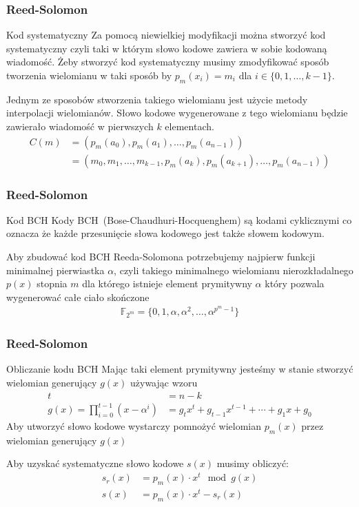 \documentclass{beamer}
\begin{document}
\begin{frame}
	\frametitle{Reed-Solomon}
	\begin{exampleblock}{Kod systematyczny}
		Za pomocą niewielkiej modyfikacji można stworzyć kod systematyczny czyli taki w którym słowo kodowe zawiera w sobie kodowaną wiadomość.
		Żeby stworzyć kod systematyczny musimy zmodyfikować sposób tworzenia wielomianu w taki sposób by $p_m(x_i)=m_i$ dla $i \in \{0,1,\ldots,k-1\}$.

		Jednym ze sposobów stworzenia takiego wielomianu jest użycie metody interpolacji wielomianów. Słowo kodowe wygenerowane z tego wielomianu będzie zawierało wiadomość w pierwszych $k$ elementach.
		\begin{align*}
			C(m) &= (p_m(a_0), p_m(a_1), \ldots, p_m(a_{n-1})) \\
			&=(m_0, m_1, \ldots, m_{k-1}, p_m(a_k), p_m(a_{k+1}), \ldots, p_m(a_{n-1}))
		\end{align*}
	\end{exampleblock}
\end{frame}

\begin{frame}
	\frametitle{Reed-Solomon}
	\begin{exampleblock}{Kod BCH}
		Kody BCH~(Bose-Chaudhuri-Hocquenghem) są kodami cyklicznymi co oznacza że
		każde przesunięcie słowa kodowego jest także słowem kodowym.

		Aby zbudować kod BCH Reeda-Solomona potrzebujemy najpierw funkcji minimalnej
		pierwiastka $\alpha$, czyli takiego minimalnego wielomianu nierozkładalnego
		$p(x)$ stopnia $m$ dla którego istnieje element prymitywny $\alpha$ który pozwala wygenerować całe ciało skończone
		\begin{align*}
			\mathbb{F}_{2^m} = \{0, 1, \alpha, \alpha^2, \ldots, \alpha^{p^{m}-1} \}
		\end{align*}
	\end{exampleblock}
\end{frame}

\begin{frame}
	\frametitle{Reed-Solomon}
	\begin{exampleblock}{Obliczanie kodu BCH}
		Mając taki element prymitywny jesteśmy w stanie stworzyć wielomian generujący $g(x)$ używając wzoru
		\begin{align*}
			t &= n - k \\
			g(x) = \prod_{i=0}^{t-1} (x - \alpha^i) &= g_{t}x^t + g_{t-1}x^{t-1} +
			\cdots + g_{1}x + g_{0}
		\end{align*}
		Aby utworzyć słowo kodowe wystarczy pomnożyć wielomian $p_m(x)$ przez wielomian generujący $g(x)$

		Aby uzyskać systematyczne słowo kodowe $s(x)$ musimy obliczyć:
		\begin{align*}
			s_r(x) &= p_m(x) \cdot x^t \mod g(x) \\
			s(x) &= p_m(x) \cdot x^t - s_r(x)
		\end{align*}
	\end{exampleblock}
\end{frame}
\end{document}
